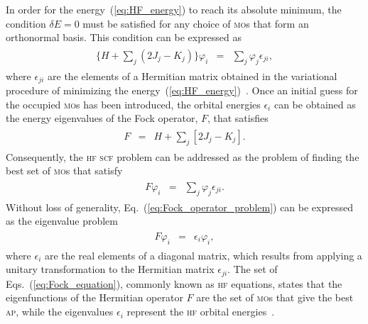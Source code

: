 In order for the energy~(\ref{eq:HF_energy}) to reach its absolute
minimum, the condition $\delta E = 0$ must be satisfied for any choice
of \textsc{mo}s that form an orthonormal basis. This condition can be
expressed as~\cite{Roothaan_HF,Levine_QChem}
%
\begin{eqnarray}
  \begin{split}
    \{H + \sum\limits_{j} ( 2J_{j} - K_{j} ) \} \varphi_{i} & = &
    \sum\limits_{j} \varphi_{j} \epsilon_{ji},
  \end{split}
\label{eq:deltaEzero}
\end{eqnarray}
%
where $\epsilon_{ji}$ are the elements of a Hermitian matrix obtained
in the variational procedure of minimizing the
energy~(\ref{eq:HF_energy})~\cite{Roothaan_HF}. Once an initial guess
for the occupied \textsc{mo}s has been introduced, the orbital
energies $\epsilon_{i}$ can be obtained as the energy eigenvalues of
the Fock operator, $F$, that satisfies
%
\begin{eqnarray}
  \begin{split}
    F & = & H +
    \sum\limits_{j} [ 2 J_{j} - K_{j} ].
  \end{split}
  \label{eq:F_operator}
\end{eqnarray}
%
Consequently, the \textsc{hf} \textsc{scf} problem can be addressed as
the problem of finding the best set of \textsc{mo}s that
satisfy~\cite{Roothaan_HF,Levine_QChem}
%
\begin{eqnarray}
  \begin{split}
    F \varphi_{i} & = & \sum\limits_{j} \varphi_{j} \epsilon_{ji}.
  \end{split}
  \label{eq:Fock_operator_problem}
\end{eqnarray}
%
Without loss of generality, Eq.~(\ref{eq:Fock_operator_problem}) can
be expressed as the eigenvalue problem
%
\begin{eqnarray}
  \begin{split}
    F \varphi_{i} & = & \epsilon_{i} \varphi_{i},
  \end{split}
  \label{eq:Fock_equation}
\end{eqnarray}
%
where $\epsilon_{i}$ are the real elements of a diagonal matrix, which
results from applying a unitary transformation to the Hermitian matrix
$\epsilon_{ji}$. The set of Eqs.~(\ref{eq:Fock_equation}), commonly
known as \textsc{hf} equations, states that the eigenfunctions of the
Hermitian operator $F$ are the set of \textsc{mo}s that give the best
\textsc{ap}, while the eigenvalues $\epsilon_{i}$ represent the
\textsc{hf} orbital energies~\cite{Roothaan_HF}.

